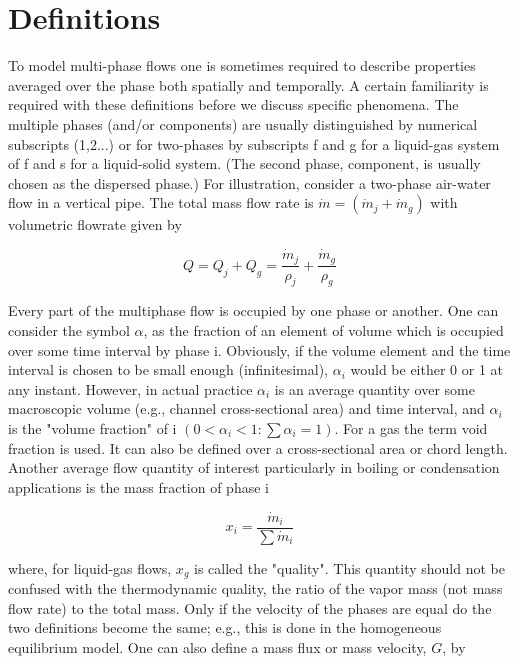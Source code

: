 \section{Definitions}

To model multi-phase flows one is sometimes required to describe properties averaged over the phase both spatially and temporally.
A certain familiarity is required with these definitions before we discuss specific phenomena.
The multiple phases (and/or components) are usually distinguished by numerical subscripts (1,2...) or for two-phases by subscripts f and g for a liquid-gas system of f and s for a liquid-solid system.
(The second phase, component, is usually chosen as the dispersed phase.)
For illustration, consider a two-phase air-water flow in a vertical pipe.
The total mass flow rate is $\dot{m} = (\dot{m}_{j} + \dot{m}_g)$ with volumetric flowrate given by

\begin{equation}
Q = Q_j + Q_g = \frac{\dot{m}_j}{\rho_j}+\frac{\dot{m}_g}{\rho_g}
\end{equation}

Every part of the multiphase flow is occupied by one phase or another.
One can consider the symbol $\alpha$, as the fraction of an element of volume which is occupied over some time interval by phase i.
Obviously, if the volume element and the time interval is chosen to be small enough (infinitesimal), $\alpha_i$ would be either 0 or 1 at any instant.
However, in actual practice $\alpha_i$ is an average quantity over some macroscopic volume (e.g., channel cross-sectional area) and time interval, and $\alpha_i$ is the "volume fraction" of i $(0 < \alpha_i < 1: \sum \alpha_i = 1)$.
For a gas the term void fraction is used.
It can also be defined over a cross-sectional area or chord length.
Another average flow quantity of interest particularly in boiling or condensation applications is the mass fraction of phase i

\begin{equation}
x_i = \frac{\dot{m}_i}{\sum \dot{m}_i}
\end{equation}

where, for liquid-gas flows, $x_g$ is called the "quality".
This quantity should not be confused with the thermodynamic quality, the ratio of the vapor mass (not mass flow rate) to the total mass.
Only if the velocity of the phases are equal do the two definitions become the same; e.g., this is done in the homogeneous equilibrium model.
One can also define a mass flux or mass velocity, $G$, by


